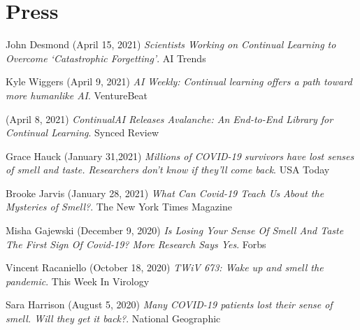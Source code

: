\documentclass[10pt]{cooperCV2}
\begin{document}
%	






\section{Press}

 
\begin{etaremune}[itemindent=-1.5\bibhang, topsep=0pt,
				   itemsep=\bibsep,partopsep=0pt,parsep=0pt,leftmargin={\bibhang+\widthof{[999]}}] 
    
    
    \item John Desmond (April 15, 2021) \textit{Scientists Working on Continual Learning to Overcome ‘Catastrophic Forgetting’}. AI Trends
     
	
    \item Kyle Wiggers (April 9, 2021) \textit{AI Weekly: Continual learning offers a path toward more humanlike AI}. VentureBeat
     
	
    \item  (April 8, 2021) \textit{ContinualAI Releases Avalanche: An End-to-End Library for Continual Learning}. Synced Review
     
	
    \item Grace Hauck (January 31,2021) \textit{Millions of COVID-19 survivors have lost senses of smell and taste. Researchers don't know if they'll come back}. USA Today
     
	
    \item Brooke Jarvis (January 28, 2021) \textit{What Can Covid-19 Teach Us About the Mysteries of Smell?}. The New York Times Magazine
     
	
    \item Misha Gajewski (December 9, 2020) \textit{Is Losing Your Sense Of Smell And Taste The First Sign Of Covid-19? More Research Says Yes}. Forbs
     
	
    \item Vincent Racaniello (October 18, 2020) \textit{TWiV 673: Wake up and smell the pandemic}. This Week In Virology
     
	
    \item Sara Harrison (August 5, 2020) \textit{Many COVID-19 patients lost their sense of smell. Will they get it back?}. National Geographic
     

\end{etaremune}
\end{document}

